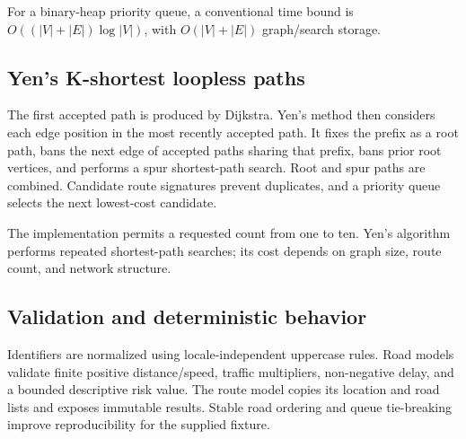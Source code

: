\documentclass[11pt,a4paper]{article}
\begin{document}
For a binary-heap priority queue, a conventional time bound is $O((|V|+|E|)\log |V|)$, with $O(|V|+|E|)$ graph/search storage.

\subsection{Yen's K-shortest loopless paths}
The first accepted path is produced by Dijkstra. Yen's method then considers each edge position in the most recently accepted path. It fixes the prefix as a root path, bans the next edge of accepted paths sharing that prefix, bans prior root vertices, and performs a spur shortest-path search. Root and spur paths are combined. Candidate route signatures prevent duplicates, and a priority queue selects the next lowest-cost candidate.

The implementation permits a requested count from one to ten. Yen's algorithm performs repeated shortest-path searches; its cost depends on graph size, route count, and network structure.

\subsection{Validation and deterministic behavior}
Identifiers are normalized using locale-independent uppercase rules. Road models validate finite positive distance/speed, traffic multipliers, non-negative delay, and a bounded descriptive risk value. The route model copies its location and road lists and exposes immutable results. Stable road ordering and queue tie-breaking improve reproducibility for the supplied fixture.
\end{document}
